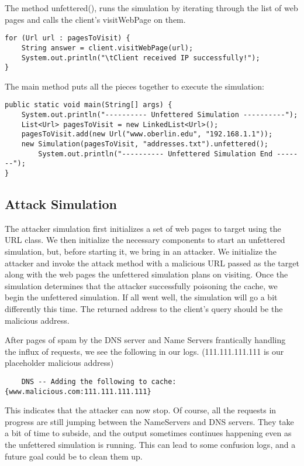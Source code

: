 \documentclass[a4paper, 12pt]{article} %
\begin{document}
The method unfettered(), runs the simulation by iterating through the list of web pages and calls the client's visitWebPage on them. 

\begin{lstlisting}
for (Url url : pagesToVisit) {
	String answer = client.visitWebPage(url);
	System.out.println("\tClient received IP successfully!");
}
\end{lstlisting}

The main method puts all the pieces together to execute the simulation:

\begin{lstlisting}
public static void main(String[] args) {
	System.out.println("---------- Unfettered Simulation ----------");
	List<Url> pagesToVisit = new LinkedList<Url>();
	pagesToVisit.add(new Url("www.oberlin.edu", "192.168.1.1"));
	new Simulation(pagesToVisit, "addresses.txt").unfettered();
		System.out.println("---------- Unfettered Simulation End -------");
}
\end{lstlisting}




\subsection*{Attack Simulation}

The attacker simulation first initializes a set of web pages to target using the URL class. We then initialize the necessary components to start an unfettered simulation, but, before starting it, we bring in an attacker. We initialize the attacker and invoke the attack method with a malicious URL passed as the target along with the web pages the unfettered simulation plans on visiting. Once the simulation determines that the attacker successfully poisoning the cache, we begin the unfettered simulation. If all went well, the simulation will go a bit differently this time. The returned address to the client's query should be the malicious address.

After pages of spam by the DNS server and Name Servers frantically handling the influx of requests, we see the following in our logs. (111.111.111.111 is our placeholder malicious address)

\begin{verbatim}
    DNS -- Adding the following to cache: {www.malicious.com:111.111.111.111}
\end{verbatim}

This indicates that the attacker can now stop. Of course, all the requests in progress are still jumping between the NameServers and DNS servers. They take a bit of time to subside, and the output sometimes continues happening even as the unfettered simulation is running. This can lead to some confusion logs, and a future goal could be to clean them up.
\end{document}
